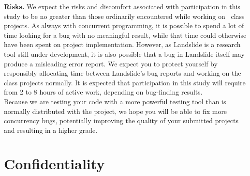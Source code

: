 \documentclass{article}
\begin{document}
{\bf Risks.}
We expect the risks and discomfort associated with participation in this study to be no greater than those ordinarily encountered while working on \classname~class projects.
As always with concurrent programming, it is possible to spend a lot of time looking for a bug with no meaningful result, while that time could otherwise have been spent on project implementation.
However, as Landslide is a research tool still under development, it is also possible that a bug in Landslide itself may produce a misleading error report. We expect you to protect yourself by responsibly allocating time between Landslide's bug reports and working on the class projects normally. It is expected that participation in this study will require from 2 to 8 hours of active work, depending on bug-finding results.
\\

Because we are testing your code with a more powerful testing tool than is normally distributed with the project, we hope you will be able to fix more concurrency bugs, potentially improving the quality of your submitted projects and resulting in a higher grade.

\section{Confidentiality}
\end{document}
